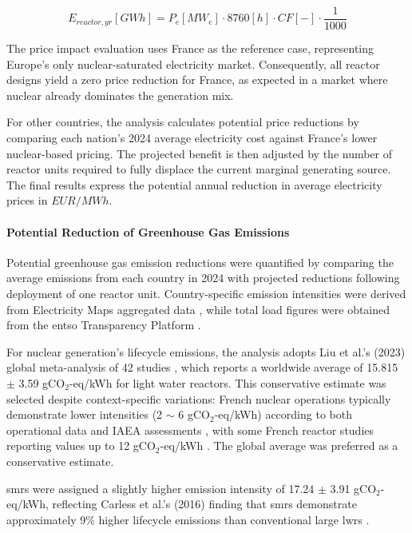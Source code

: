 \begin{equation}
\label{eq:energy_yearly}
E_{reactor,yr} [GWh] = P_{e}[MW_e] \cdot 8760 [h] \cdot CF [-] \cdot \frac{1}{1000}
\end{equation}

The price impact evaluation uses France as the reference case, representing Europe's only nuclear-saturated electricity market. Consequently, all reactor designs yield a zero price reduction for France, as expected in a market where nuclear already dominates the generation mix.

For other countries, the analysis calculates potential price reductions by comparing each nation's 2024 average electricity cost against France's lower nuclear-based pricing. The projected benefit is then adjusted by the number of reactor units required to fully displace the current marginal generating source. The final results express the potential annual reduction in average electricity prices in $EUR/MWh$.

\paragraph{Potential Reduction of Greenhouse Gas Emissions}
\label{sec:ghg_red}
Potential greenhouse gas emission reductions were quantified by comparing the average emissions from each country in 2024 with projected reductions following deployment of one reactor unit. Country-specific emission intensities were derived from Electricity Maps aggregated data \cite{ElectricityMaps_CarbonIntensity_2024}, while total load figures were obtained from the \gls{entso} Transparency Platform \cite{ENTSOE_Transparency_2025}.

For nuclear generation's lifecycle emissions, the analysis adopts Liu et al.'s (2023) global meta-analysis of 42 studies \cite{10.3389/fenrg.2023.1147016}, which reports a worldwide average of 15.815 $\pm$ 3.59 gCO$_2$-eq/kWh for light water reactors. This conservative estimate was selected despite context-specific variations: French nuclear operations typically demonstrate lower intensities (2 $\sim$ 6 gCO$_2$-eq/kWh) according to both operational data \cite{paillere_2021} and IAEA assessments \cite{IAEA_Climate_Change_Nuclear_Power_2022}, with some French reactor studies reporting values up to 12 gCO$_2$-eq/kWh \cite{paillere_2021}. The global average was preferred as a conservative estimate.

\glspl{smr} were assigned a slightly higher emission intensity of 17.24 $\pm$ 3.91 gCO$_2$-eq/kWh, reflecting Carless et al.'s (2016) finding that \glspl{smr} demonstrate approximately 9\% higher lifecycle emissions than conventional large \glspl{lwr} \cite{CARLESS201684}.

